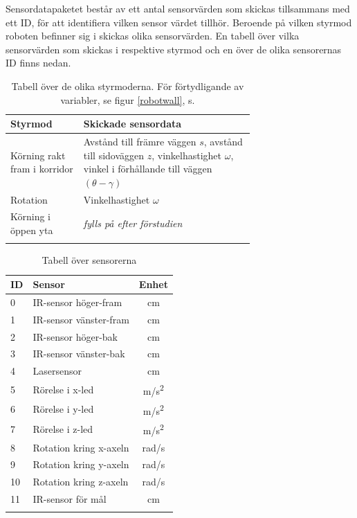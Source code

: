 \documentclass[11pt]{article}
\begin{document}
\begin{flushleft}
Sensordatapaketet består av ett antal sensorvärden som skickas tillsammans med ett ID, för att identifiera vilken sensor värdet tillhör. Beroende på vilken styrmod roboten befinner sig i skickas olika sensorvärden. En tabell över vilka sensorvärden som skickas i respektive styrmod och en över de olika sensorernas ID finns nedan.

\begin{longtable}[l]{| l | p{0.7\linewidth} |} \hline
\textbf{Styrmod} & \textbf{Skickade sensordata} \\ \hline 
Körning rakt fram i korridor & Avstånd till främre väggen $s$, avstånd till sidoväggen $z$, vinkelhastighet $\omega$, vinkel i förhållande till väggen $(\theta-\gamma)$ \\ \hline
Rotation & Vinkelhastighet $\omega$ \\ \hline
Körning i öppen yta & \textit{fylls på efter förstudien} \\ \hline
\caption{Tabell över de olika styrmoderna. För förtydligande av variabler, se figur \ref{robotwall}, s.\pageref{robotwall}}
\end{longtable}


\begin{longtable}[l]{| l | l | c |} \hline
\textbf{ID} & \textbf{Sensor} & \textbf{Enhet} \\ \hline 
0 & IR-sensor höger-fram & cm \\ \hline
1 & IR-sensor vänster-fram  & cm \\ \hline
2 & IR-sensor höger-bak  & cm  \\ \hline
3 & IR-sensor vänster-bak  &  cm \\ \hline
4 & Lasersensor & cm  \\ \hline
5 & Rörelse i x-led & m/s\textsuperscript{2} \\ \hline
6 & Rörelse i y-led & m/s\textsuperscript{2} \\ \hline
7 & Rörelse i z-led & m/s\textsuperscript{2} \\ \hline
8 & Rotation kring x-axeln & rad/s \\ \hline
9 & Rotation kring y-axeln & rad/s \\ \hline
10 & Rotation kring z-axeln & rad/s \\ \hline
11 & IR-sensor för mål & cm \\ \hline
\caption{Tabell över sensorerna}\label{sensortab}
\end{longtable}


\end{flushleft}
\end{document}

